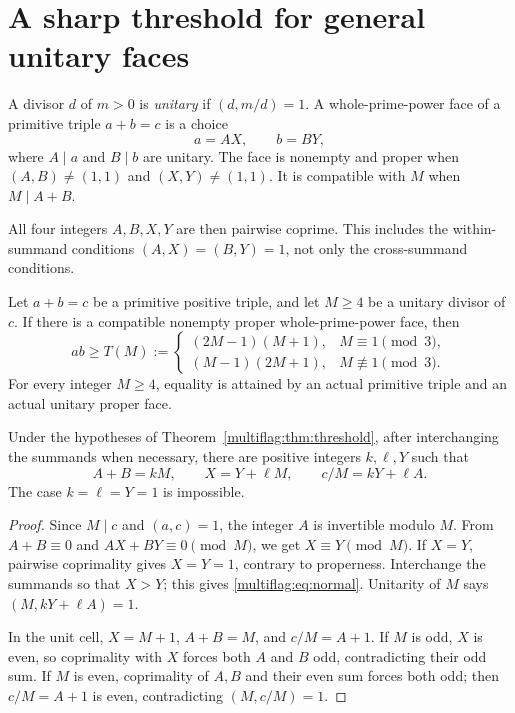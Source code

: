 \section{A sharp threshold for general unitary faces}\label{multiflag:sec:threshold}
\begin{definition}
A divisor \(d\) of \(m>0\) is \emph{unitary} if \((d,m/d)=1\). A whole-prime-power face of a primitive triple \(a+b=c\) is a choice
\[
 a=AX,\qquad b=BY,
\]
where \(A\mid a\) and \(B\mid b\) are unitary. The face is nonempty and proper when \((A,B)\ne(1,1)\) and \((X,Y)\ne(1,1)\). It is compatible with \(M\) when \(M\mid A+B\).
\end{definition}
All four integers \(A,B,X,Y\) are then pairwise coprime. This includes the within-summand conditions \((A,X)=(B,Y)=1\), not only the cross-summand conditions.

\begin{theorem}\label{multiflag:thm:threshold}
Let \(a+b=c\) be a primitive positive triple, and let \(M\ge4\) be a unitary divisor of \(c\). If there is a compatible nonempty proper whole-prime-power face, then
\begin{equation}\label{multiflag:eq:threshold}
 ab\ge T(M):=
 \begin{cases}
 (2M-1)(M+1),&M\equiv1\pmod3,\\
 (M-1)(2M+1),&M\not\equiv1\pmod3.
 \end{cases}
\end{equation}
For every integer \(M\ge4\), equality is attained by an actual primitive triple and an actual unitary proper face.
\end{theorem}

\begin{lemma}\label{multiflag:lem:cell}
Under the hypotheses of Theorem~\ref{multiflag:thm:threshold}, after interchanging the summands when necessary, there are positive integers \(k,\ell,Y\) such that
\begin{equation}\label{multiflag:eq:normal}
 A+B=kM,\qquad X=Y+\ell M,\qquad c/M=kY+\ell A.
\end{equation}
The case \(k=\ell=Y=1\) is impossible.
\end{lemma}
\begin{proof}
Since \(M\mid c\) and \((a,c)=1\), the integer \(A\) is invertible modulo \(M\). From \(A+B\equiv0\) and \(AX+BY\equiv0\pmod M\), we get \(X\equiv Y\pmod M\). If \(X=Y\), pairwise coprimality gives \(X=Y=1\), contrary to properness. Interchange the summands so that \(X>Y\); this gives \eqref{multiflag:eq:normal}. Unitarity of \(M\) says \((M,kY+\ell A)=1\).

In the unit cell, \(X=M+1\), \(A+B=M\), and \(c/M=A+1\). If \(M\) is odd, \(X\) is even, so coprimality with \(X\) forces both \(A\) and \(B\) odd, contradicting their odd sum. If \(M\) is even, coprimality of \(A,B\) and their even sum forces both odd; then \(c/M=A+1\) is even, contradicting \((M,c/M)=1\).
\end{proof}

